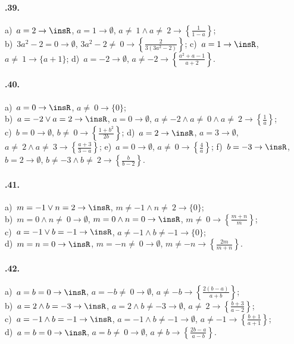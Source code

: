 \paragraph{\thechapter.39.}
a)~$a=2 \rightarrow \insR$, $a=1 \rightarrow \emptyset$, $a\neq~1\wedge a\neq~2 \rightarrow \left\{\frac{1}{1-a}\right\}$;
\quad\protect\\
b)~$3a^{2}-2=0 \rightarrow \emptyset$, $3a^{2}-2\neq~0 \rightarrow \left\{\frac{2}{3(3a^{2}-2)}\right\}$;
\quad c)~$a=1 \rightarrow \insR$, $a\neq~1 \rightarrow \{a+1\}$;
\quad d)~$a=-2 \rightarrow \emptyset$, $a\neq -2 \rightarrow \left\{\frac{a^{2}+a-1}{a+2}\right\}$.

\paragraph{\thechapter.40.}
a)~$a=0 \rightarrow \insR$, $a\neq~0 \rightarrow \{0\}$;
\quad \protect\\
b)~$a=-2\vee a=2 \rightarrow \insR$, $a=0 \rightarrow \emptyset$, $a\neq -2\wedge a\neq~0\wedge a\neq~2 \rightarrow \left\{\frac{1}{a}\right\}$;
\quad\protect\\
c)~$b=0 \rightarrow \emptyset$, $b\neq~0 \rightarrow \left\{\frac{1+b^{2}}{2b}\right\}$;
\quad d)~$a=2 \rightarrow \insR$, $a=3 \rightarrow \emptyset$, $a\neq~2\wedge a\neq~3 \rightarrow \left\{\frac{a+3}{3-a}\right\}$;
\quad e)~$a=0 \rightarrow \emptyset$, $a\neq~0 \rightarrow \left\{\frac{4}{a}\right\}$;
\quad f)~$b=-3 \rightarrow \insR$, $b=2 \rightarrow \emptyset$, $b\neq -3\wedge b\neq~2 \rightarrow \left\{\frac{b}{b-2}\right\}$.

\paragraph{\thechapter.41.}
a)~$m=-1\vee n=2 \rightarrow \insR$, $m\neq -1\wedge n\neq~2 \rightarrow \{0\}$;
\protect\\
b)~$m=0\wedge n\neq~0 \rightarrow \emptyset$, $m=0\wedge n=0 \rightarrow \insR$, $m\neq~0 \rightarrow \left\{\frac{m+n}{m}\right\}$;
\protect\\
c)~$a=-1\vee b=-1 \rightarrow \insR$, $a\neq -1\wedge b\neq -1 \rightarrow \{0\}$;
\protect\\ d)~$m=n=0 \rightarrow \insR$, $m=-n\neq~0 \rightarrow \emptyset$, $m\neq -n \rightarrow \left\{\frac{2m}{m+n}\right\}$.

\paragraph{\thechapter.42.}
a)~$a=b=0 \rightarrow \insR$, $a=-b\neq~0 \rightarrow \emptyset$, $a\neq -b \rightarrow \left\{\frac{2(b-a)}{a+b}\right\}$;
\protect\\ b)~$a=2\wedge b=-3 \rightarrow \insR$, $a=2\wedge b\neq -3 \rightarrow \emptyset$, $a\neq~2 \rightarrow \left\{\frac{b+3}{a-2}\right\}$;
\protect\\ c)~$a=-1\wedge b=-1 \rightarrow \insR$, $a=-1\wedge b\neq -1 \rightarrow \emptyset$, $a\neq -1 \rightarrow \left\{\frac{b+1}{a+1}\right\}$;
\protect\\ d)~$a=b=0 \rightarrow \insR$, $a=b\neq~0 \rightarrow \emptyset$, $a\neq b \rightarrow \left\{\frac{2b-a}{a-b}\right\}$.

